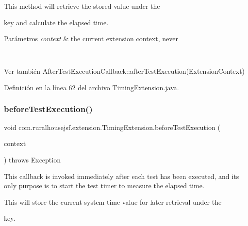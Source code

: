 This method will retrieve the stored value under the
\begin{DoxyCode}{0}
\end{DoxyCode}


key and calculate the elapsed time.


\begin{DoxyParams}{Parámetros}
{\em context} & the current extension context, never
\begin{DoxyCode}{1}
\DoxyCodeLine{\textcolor{keyword}{null} }
\end{DoxyCode}
\\
\hline
\end{DoxyParams}
\begin{DoxySeeAlso}{Ver también}
After\+Test\+Execution\+Callback\+::after\+Test\+Execution(\+Extension\+Context) 
\end{DoxySeeAlso}


Definición en la línea 62 del archivo Timing\+Extension.\+java.

\mbox{\label{classcom_1_1ruralhousejsf_1_1extension_1_1_timing_extension_ad19d0a2513bd9041f9263c1d9536ed6c}} 
\subsubsection{\texorpdfstring{beforeTestExecution()}{beforeTestExecution()}}
{\footnotesize\ttfamily void com.\+ruralhousejsf.\+extension.\+Timing\+Extension.\+before\+Test\+Execution (\begin{DoxyParamCaption}\item[{Extension\+Context}]{context }\end{DoxyParamCaption}) throws Exception}

This callback is invoked {\ttfamily immediately after} each test has been executed, and its only purpose is to start the test timer to measure the elapsed time. 

This will store the current system time value for later retrieval under the
\begin{DoxyCode}{0}
\end{DoxyCode}
 key.


